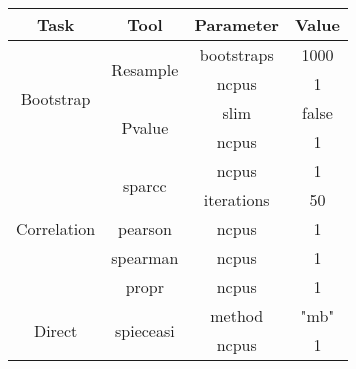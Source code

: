 \begin{table}[H]
\centering
\small
\begin{tabular}{|c|c|c|c|}
\hline
\textbf{Task}                & \textbf{Tool}                                                                           & \textbf{Parameter}     & \textbf{Value} \\ \hline
\multirow{4}{*}{Bootstrap}   & \multirow{2}{*}{Resample}                                                               & bootstraps             & 1000           \\
                             &                                                                                         & ncpus                  & 1              \\ \cline{2-4}
                             & \multirow{2}{*}{Pvalue}                                                                 & slim                   & false          \\
                             &                                                                                         & ncpus                  & 1              \\ \hline
\multirow{5}{*}{Correlation} & \multirow{2}{*}{sparcc}                                                                 & ncpus                  & 1              \\
                             &                                                                                         & iterations             & 50             \\ \cline{2-4}
                             & pearson                                                                                 & ncpus                  & 1              \\ \cline{2-4}
                             & spearman                                                                                & ncpus                  & 1              \\ \cline{2-4}
                             & propr                                                                                   & ncpus                  & 1              \\ \hline
\multirow{17}{*}{Direct}     & \multirow{5}{*}{spieceasi}                                                              & method                 & "mb"           \\
                             &                                                                                         & ncpus                  & 1              \\

\end{tabular}
\end{table}
